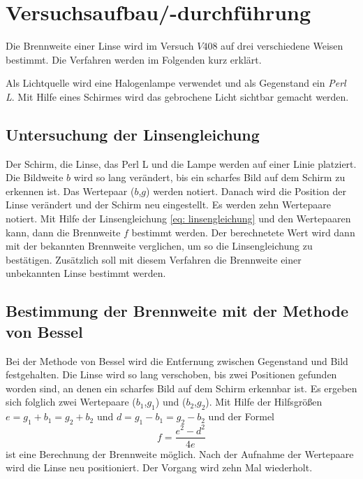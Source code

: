 \section{Versuchsaufbau/-durchführung}
Die Brennweite einer Linse wird im Versuch $V408$ auf drei
verschiedene Weisen bestimmt.
Die Verfahren werden im Folgenden kurz erklärt.

Als Lichtquelle wird eine Halogenlampe verwendet und als
Gegenstand ein \emph{Perl L}. Mit Hilfe eines Schirmes wird %
das gebrochene Licht sichtbar gemacht werden.

\subsection{Untersuchung der Linsengleichung} %

Der Schirm, die Linse, das Perl L und die Lampe werden auf einer
Linie platziert.
Die Bildweite $b$ wird so lang verändert, bis ein scharfes Bild auf dem %
Schirm zu erkennen ist. Das Wertepaar ($b$,$g$) werden notiert.
Danach wird die Position der Linse verändert und der Schirm neu eingestellt. %
Es werden zehn Wertepaare notiert. %
Mit Hilfe der Linsengleichung \eqref{eq: linsengleichung} und den Wertepaaren kann, dann die
Brennweite $f$ bestimmt werden. Der berechnetete Wert wird dann mit der bekannten Brennweite
verglichen, um so die Linsengleichung zu bestätigen.  %
Zusätzlich soll mit diesem Verfahren die Brennweite einer unbekannten Linse bestimmt werden.

\subsection{Bestimmung der Brennweite mit der Methode von Bessel}
Bei der Methode von Bessel wird die Entfernung zwischen %
Gegenstand und Bild festgehalten. Die Linse wird so lang verschoben, bis zwei
Positionen gefunden worden sind, an denen ein scharfes Bild auf dem Schirm erkennbar ist.
Es ergeben sich folglich zwei Wertepaare ($b_1$,$g_1$) und ($b_2$,$g_2$).
Mit Hilfe der Hilfsgrößen $e=g_1+b_1=g_2+b_2$ und $d=g_1-b_1=g_2-b_2$ und der Formel %
\begin{equation}
  \label{eq: bessel_methode}
  f=\frac{e^2-d^2}{4e}
\end{equation}
ist eine Berechnung der Brennweite möglich.
Nach der Aufnahme der Wertepaare wird die Linse neu positioniert.
Der Vorgang wird zehn Mal wiederholt.

